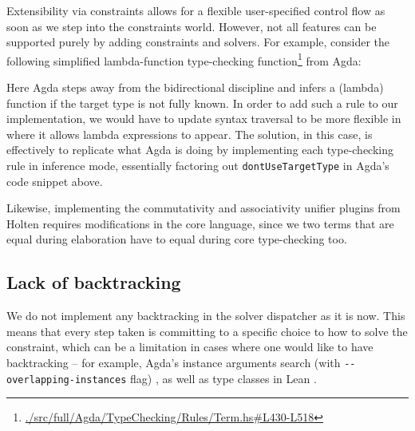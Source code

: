 Extensibility via constraints allows for a flexible user-specified
control flow as soon as we step into the constraints world. However, not
all features can be supported purely by adding constraints and solvers.
For example, consider the following simplified lambda-function
type-checking function\footnote{\href{https://github.com/agda/agda/blob/v2.6.4/src/full/Agda/TypeChecking/Rules/Term.hs\#L430-L518}{./src/full/Agda/TypeChecking/Rules/Term.hs\#L430-L518}}
from Agda:

\begin{imageonly}
\begin{Shaded}
\begin{Highlighting}[]
\OtherTok{=} 
  \OtherTok{\textless{}{-}}
  \OperatorTok{\textless{}}\OperatorTok{||}\OperatorTok{/=} 
\end{Highlighting}
\end{Shaded}
\end{imageonly}

Here Agda steps away from the bidirectional discipline and infers a
(lambda) function if the target type is not fully known. In order to add
such a rule to our implementation, we would have to update syntax
traversal to be more flexible in where it allows lambda expressions to
appear. The solution, in this case, is effectively to replicate what
Agda is doing by implementing each type-checking rule in inference mode,
essentially factoring out \texttt{dontUseTargetType} in Agda's code
snippet above.

Likewise, implementing the commutativity and associativity unifier
plugins from Holten \cite{holtenDependentTypeCheckingModulo2023} requires
modifications in the core language, since we two terms that are equal
during elaboration have to equal during core type-checking too.

\hypertarget{lack-of-backtracking}{%
\subsection{Lack of backtracking}\label{lack-of-backtracking}}

We do not implement any backtracking in the solver dispatcher as it is
now. This means that every step taken is committing to a specific choice
to how to solve the constraint, which can be a limitation in cases where
one would like to have backtracking -- for example, Agda's instance
arguments search (with \texttt{-\/-overlapping-instances} flag)
\citep[chap.~3.18]{theagdateamAgdaUserManual2023a}, as well as type
classes in Lean \citep{selsamTabledTypeclassResolution2020}.

